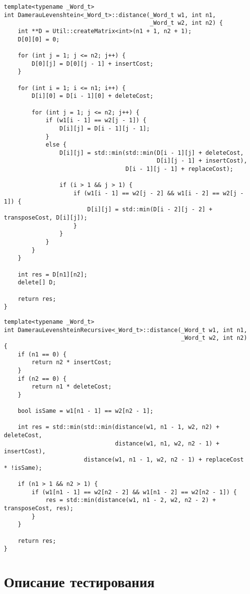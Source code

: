 \noindent\begin{minipage}{\textwidth}
\begin{lstlisting}[caption=Расстояние Дамерау-Левенштейна (матричная реализация)]
template<typename _Word_t>
int DamerauLevenshtein<_Word_t>::distance(_Word_t w1, int n1,
                                          _Word_t w2, int n2) {
    int **D = Util::createMatrix<int>(n1 + 1, n2 + 1);
    D[0][0] = 0;

    for (int j = 1; j <= n2; j++) {
        D[0][j] = D[0][j - 1] + insertCost;
    }

    for (int i = 1; i <= n1; i++) {
        D[i][0] = D[i - 1][0] + deleteCost;

        for (int j = 1; j <= n2; j++) {
            if (w1[i - 1] == w2[j - 1]) {
                D[i][j] = D[i - 1][j - 1];
            }
            else {
                D[i][j] = std::min(std::min(D[i - 1][j] + deleteCost,
                                            D[i][j - 1] + insertCost),
                                   D[i - 1][j - 1] + replaceCost);

                if (i > 1 && j > 1) {
                    if (w1[i - 1] == w2[j - 2] && w1[i - 2] == w2[j - 1]) {
                        D[i][j] = std::min(D[i - 2][j - 2] + transposeCost, D[i][j]);
                    }
                }
            }
        }
    }

    int res = D[n1][n2];
    delete[] D;

    return res;
}
\end{lstlisting}
\end{minipage}

\noindent\begin{minipage}{\textwidth}
\begin{lstlisting}[caption=Расстояние Дамерау-Левенштейна (рекурсивная реализация)]
template<typename _Word_t>
int DamerauLevenshteinRecursive<_Word_t>::distance(_Word_t w1, int n1,
                                                   _Word_t w2, int n2) {
    if (n1 == 0) {
        return n2 * insertCost;
    }
    if (n2 == 0) {
        return n1 * deleteCost;
    }

    bool isSame = w1[n1 - 1] == w2[n2 - 1];

    int res = std::min(std::min(distance(w1, n1 - 1, w2, n2) + deleteCost,
                                distance(w1, n1, w2, n2 - 1) + insertCost),
                       distance(w1, n1 - 1, w2, n2 - 1) + replaceCost * !isSame);

    if (n1 > 1 && n2 > 1) {
        if (w1[n1 - 1] == w2[n2 - 2] && w1[n1 - 2] == w2[n2 - 1]) {
            res = std::min(distance(w1, n1 - 2, w2, n2 - 2) + transposeCost, res);
        }
    }

    return res;
}
\end{lstlisting}
\end{minipage}

\section{Описание тестирования}

